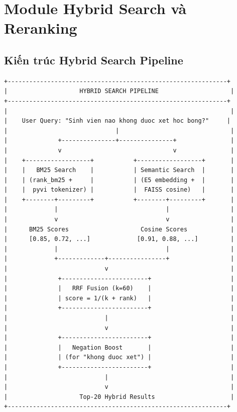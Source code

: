 \documentclass[../DoAn.tex]{subfiles}
\begin{document}
\section{Module Hybrid Search và Reranking}

\subsection{Kiến trúc Hybrid Search Pipeline}
\begin{verbatim}
+-------------------------------------------------------------+
|                    HYBRID SEARCH PIPELINE                    |
+-------------------------------------------------------------+
|                                                              |
|    User Query: "Sinh vien nao khong duoc xet hoc bong?"     |
|                              |                               |
|              +---------------+---------------+               |
|              v                               v               |
|    +------------------+           +------------------+       |
|    |   BM25 Search    |           | Semantic Search  |       |
|    | (rank_bm25 +     |           | (E5 embedding +  |       |
|    |  pyvi tokenizer) |           |  FAISS cosine)   |       |
|    +--------+---------+           +--------+---------+       |
|             |                              |                 |
|             v                              v                 |
|      BM25 Scores                    Cosine Scores            |
|      [0.85, 0.72, ...]             [0.91, 0.88, ...]         |
|             |                              |                 |
|             +-------------+----------------+                 |
|                           v                                  |
|              +------------------------+                      |
|              |   RRF Fusion (k=60)    |                      |
|              | score = 1/(k + rank)   |                      |
|              +------------------------+                      |
|                           |                                  |
|                           v                                  |
|              +------------------------+                      |
|              |   Negation Boost       |                      |
|              | (for "khong duoc xet") |                      |
|              +------------------------+                      |
|                           |                                  |
|                           v                                  |
|                    Top-20 Hybrid Results                     |
+-------------------------------------------------------------+
\end{verbatim}
\end{document}
